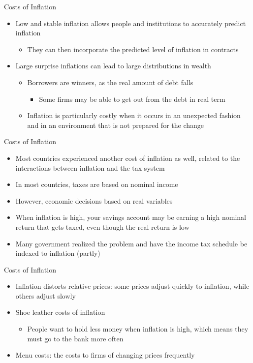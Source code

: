 \documentclass[aspectratio=1610]{beamer}
\begin{document}
\begin{frame}[wide]{Costs of Inflation}
	\begin{itemize}
		\item Low and stable inflation allows people and institutions to accurately predict inflation
		\begin{itemize}
			\item They can then incorporate the predicted level of inflation in contracts
		\end{itemize}
		\item Large surprise inflations can lead to large distributions in wealth
		\begin{itemize}
			\item Borrowers are winners, as the real amount of debt falls
			\begin{itemize}
				\item Some firms may be able to get out from the debt in real term
			\end{itemize}
			\item Inflation is particularly costly when it occurs in an unexpected fashion and in an environment that is not prepared for the change
		\end{itemize} 
	\end{itemize}
\end{frame}

\begin{frame}[wide]{Costs of Inflation}
	\begin{itemize}
		\item Most countries experienced another cost of inflation as well, related to the interactions between inflation and the tax system
		\item In most countries, taxes are based on nominal income
		\item However, economic decisions based on real variables
		\item When inflation is high, your savings account may be earning a high nominal return that gets taxed, even though the real return is low
		\item Many government realized the problem and have the income tax schedule be indexed to inflation (partly)
	\end{itemize}
\end{frame}

\begin{frame}[wide]{Costs of Inflation}
	\begin{itemize}
		\item Inflation distorts relative prices: some prices adjust quickly to inflation, while others adjust slowly
		\item Shoe leather costs of inflation
		\begin{itemize}
			\item People want to hold less money when inflation is high, which means they must go to the bank more often
		\end{itemize}
		\item Menu costs: the costs to firms of changing prices frequently
		
	\end{itemize}
\end{frame}
\end{document}
